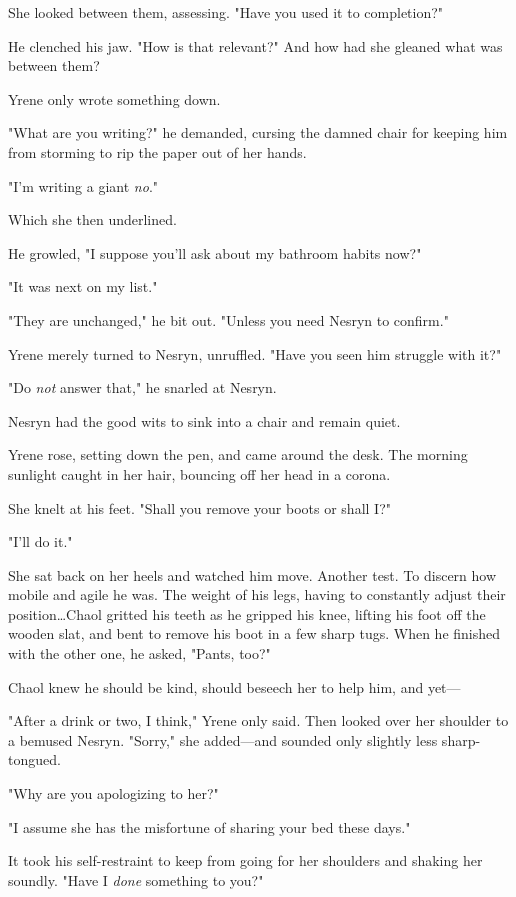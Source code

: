 She looked between them, assessing.
"Have you used it to completion?"

He clenched his jaw.
"How is that relevant?"
And how had she gleaned what was between them?

Yrene only wrote something down.

"What are you writing?"
he demanded, cursing the damned chair for keeping him from storming to rip the paper out of her hands.

"I'm writing a giant \emph{no}."

Which she then underlined.

He growled, "I suppose you'll ask about my bathroom habits now?"

"It was next on my list."

"They are unchanged," he bit out.
"Unless you need Nesryn to confirm."

Yrene merely turned to Nesryn, unruffled.
"Have you seen him struggle with it?"

"Do \emph{not} answer that," he snarled at Nesryn.

Nesryn had the good wits to sink into a chair and remain quiet.

Yrene rose, setting down the pen, and came around the desk.
The morning sunlight caught in her hair, bouncing off her head in a corona.

She knelt at his feet.
"Shall you remove your boots or shall I?"

"I'll do it."

She sat back on her heels and watched him move.
Another test.
To discern how mobile and agile he was.
The weight of his legs, having to constantly adjust their position\ldots Chaol gritted his teeth as he gripped his knee, lifting his foot off the wooden slat, and bent to remove his boot in a few sharp tugs.
When he finished with the other one, he asked, "Pants, too?"

Chaol knew he should be kind, should beseech her to help him, and yet---

"After a drink or two, I think," Yrene only said.
Then looked over her shoulder to a bemused Nesryn.
"Sorry," she added---and sounded only slightly less sharp-tongued.

"Why are you apologizing to her?"

"I assume she has the misfortune of sharing your bed these days."

It took his self-restraint to keep from going for her shoulders and shaking her soundly.
"Have I \emph{done} something to you?"

